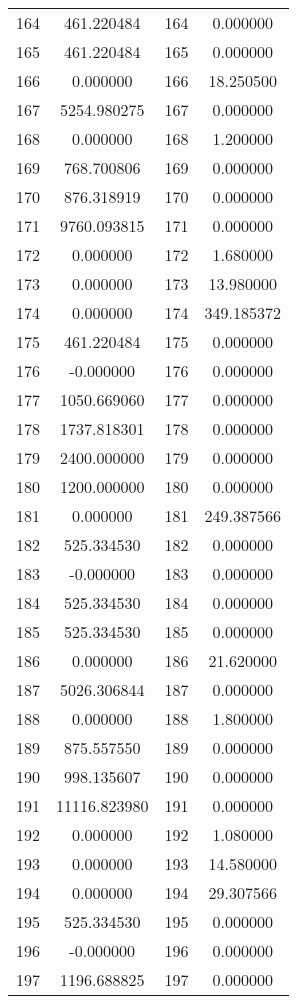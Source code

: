 \documentclass[12pt]{article}
\begin{document}
\begin{longtable}{@{}cccc@{}}
164 & 461.220484 & 164 & 0.000000 \\
165 & 461.220484 & 165 & 0.000000 \\
166 & 0.000000 & 166 & 18.250500 \\
167 & 5254.980275 & 167 & 0.000000 \\
168 & 0.000000 & 168 & 1.200000 \\
169 & 768.700806 & 169 & 0.000000 \\
170 & 876.318919 & 170 & 0.000000 \\
171 & 9760.093815 & 171 & 0.000000 \\
172 & 0.000000 & 172 & 1.680000 \\
173 & 0.000000 & 173 & 13.980000 \\
174 & 0.000000 & 174 & 349.185372 \\
175 & 461.220484 & 175 & 0.000000 \\
176 & -0.000000 & 176 & 0.000000 \\
177 & 1050.669060 & 177 & 0.000000 \\
178 & 1737.818301 & 178 & 0.000000 \\
179 & 2400.000000 & 179 & 0.000000 \\
180 & 1200.000000 & 180 & 0.000000 \\
181 & 0.000000 & 181 & 249.387566 \\
182 & 525.334530 & 182 & 0.000000 \\
183 & -0.000000 & 183 & 0.000000 \\
184 & 525.334530 & 184 & 0.000000 \\
185 & 525.334530 & 185 & 0.000000 \\
186 & 0.000000 & 186 & 21.620000 \\
187 & 5026.306844 & 187 & 0.000000 \\
188 & 0.000000 & 188 & 1.800000 \\
189 & 875.557550 & 189 & 0.000000 \\
190 & 998.135607 & 190 & 0.000000 \\
191 & 11116.823980 & 191 & 0.000000 \\
192 & 0.000000 & 192 & 1.080000 \\
193 & 0.000000 & 193 & 14.580000 \\
194 & 0.000000 & 194 & 29.307566 \\
195 & 525.334530 & 195 & 0.000000 \\
196 & -0.000000 & 196 & 0.000000 \\
197 & 1196.688825 & 197 & 0.000000 \\

\end{longtable}
\end{document}
